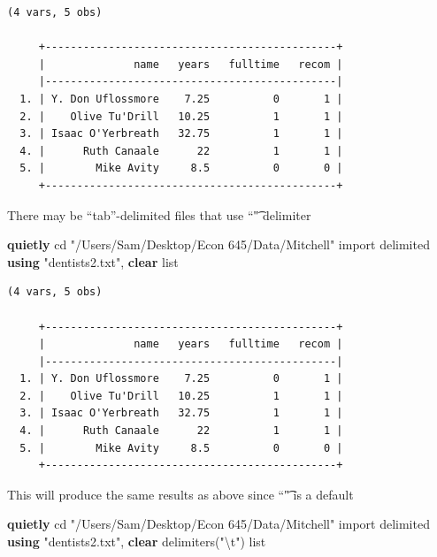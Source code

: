 \documentclass[
]{book}
\newenvironment{Shaded}{\begin{snugshade}}{\end{snugshade}}
\newcommand{\CharTok}[1]{\textcolor[rgb]{0.31,0.60,0.02}{#1}}
\newcommand{\KeywordTok}[1]{\textcolor[rgb]{0.13,0.29,0.53}{\textbf{#1}}}
\newcommand{\NormalTok}[1]{#1}
\newcommand{\OtherTok}[1]{\textcolor[rgb]{0.56,0.35,0.01}{#1}}
\newcommand{\StringTok}[1]{\textcolor[rgb]{0.31,0.60,0.02}{#1}}
\begin{document}
\begin{verbatim}
(4 vars, 5 obs)

     +----------------------------------------------+
     |              name   years   fulltime   recom |
     |----------------------------------------------|
  1. | Y. Don Uflossmore    7.25          0       1 |
  2. |    Olive Tu'Drill   10.25          1       1 |
  3. | Isaac O'Yerbreath   32.75          1       1 |
  4. |      Ruth Canaale      22          1       1 |
  5. |        Mike Avity     8.5          0       0 |
     +----------------------------------------------+
\end{verbatim}

There may be ``tab''-delimited files that use ``\t" delimiter

\begin{Shaded}
\begin{Highlighting}[]
\KeywordTok{quietly}\NormalTok{ cd }\StringTok{"/Users/Sam/Desktop/Econ 645/Data/Mitchell"}
\NormalTok{import delimited }\KeywordTok{using} \StringTok{"dentists2.txt"}\NormalTok{, }\KeywordTok{clear}
\OtherTok{list}
\end{Highlighting}
\end{Shaded}

\begin{verbatim}
(4 vars, 5 obs)

     +----------------------------------------------+
     |              name   years   fulltime   recom |
     |----------------------------------------------|
  1. | Y. Don Uflossmore    7.25          0       1 |
  2. |    Olive Tu'Drill   10.25          1       1 |
  3. | Isaac O'Yerbreath   32.75          1       1 |
  4. |      Ruth Canaale      22          1       1 |
  5. |        Mike Avity     8.5          0       0 |
     +----------------------------------------------+
\end{verbatim}

This will produce the same results as above since ``\t" is a default

\begin{Shaded}
\begin{Highlighting}[]
\KeywordTok{quietly}\NormalTok{ cd }\StringTok{"/Users/Sam/Desktop/Econ 645/Data/Mitchell"}
\NormalTok{import delimited }\KeywordTok{using} \StringTok{"dentists2.txt"}\NormalTok{, }\KeywordTok{clear}\NormalTok{ delimiters(}\StringTok{"}\CharTok{\textbackslash{}t}\StringTok{"}\NormalTok{)}
\OtherTok{list}
\end{Highlighting}
\end{Shaded}
\end{document}
